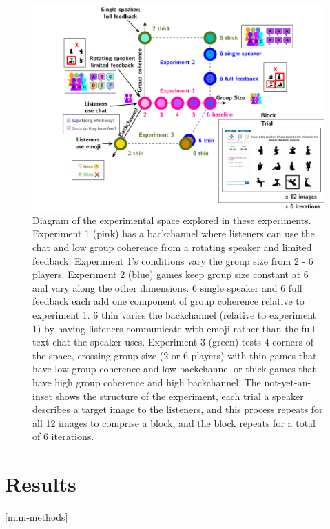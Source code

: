 \documentclass[
  english,
  a4paper,
]{article}
\begin{document}
\begin{figure}[t!]

{\centering \includegraphics[width=1\linewidth]{expt-diagram} 

}

\caption{Diagram of the experimental space explored in these experiments. Experiment 1 (pink) has a backchannel where listeners can use the chat and low group coherence from a rotating speaker and limited feedback. Experiment 1's conditions vary the group size from 2 - 6 players. Experiment 2 (blue) games keep group size constant at 6 and vary along the other dimensions. 6 single speaker and 6 full feedback each add one component of group coherence relative to experiment 1. 6 thin varies the backchannel (relative to experiment 1) by having listeners communicate with emoji rather than the full text chat the speaker uses. Experiment 3 (green) tests 4 corners of the space, crossing group size (2 or 6 players) with thin games that have low group coherence and low backchannel or thick games that have high group coherence and high backchannel.  The not-yet-an-inset shows the structure of the experiment, each trial a speaker describes a target image to the listeners, and this process repeats for all 12 images to comprise a block, and the block repeats for a total of 6 iterations.}\label{fig:diagram}
\end{figure}

\hypertarget{results}{%
\section{Results}\label{results}}

{[}mini-methods{]}
\end{document}
